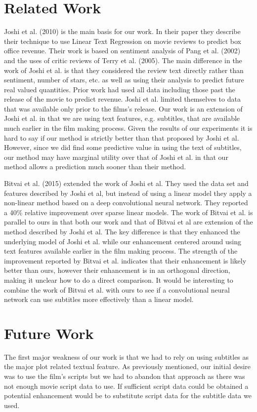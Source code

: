 \documentclass[11pt]{article}
\begin{document}
\section{Related Work}
Joshi et al. (2010) is the main basis for our work. In their paper they describe their
technique to use Linear Text Regression on movie reviews to predict box office revenue.
Their work is based on sentiment analysis of Pang et al. (2002) and the uses of critic
reviews of Terry et al. (2005). The main difference in the work of Joshi et al. is that
they considered the review text directly rather than sentiment, number of stars, etc. as
well as using their analysis to predict future real valued quantities. Prior work had
used all data including those past the release of the movie to predict revenue. Joshi
et al. limited themselves to data that was available only prior to the films's release.
Our work is an extension of Joshi et al. in that we are using text features, e.g.
subtitles, that are available much earlier in the film making process. Given the results
of our experiments it is hard to say if our method is strictly better than that proposed
by Joshi et al. However, since we did find some predictive value in using the text of
subtitles, our method may have marginal utility over that of Joshi et al. in that our
method allows a prediction much sooner than their method.

Bitvai et al. (2015) extended the work of Joshi et al. They used the data set and
features described by Joshi et al, but instead of using a linear model they apply
a non-linear method based on a deep convolutional neural network. They reported a 40\%
relative improvement over sparse linear models. The work of Bitvai et al. is parallel to
ours in that both our work and that of Bitvai et al are extension of the method described
by Joshi et al. The key difference is that they enhanced the underlying model of Joshi
et al. while our enhancement centered around using text features available earlier
in the film making process. The strength of the improvement reported by Bitvai et al. 
indicates that their enhancement is likely better than ours, however their enhancement is
in an orthogonal direction, making it unclear how to do a direct comparison.
It would be interesting to combine the work of Bitvai et al. with ours to see if a
convolutional neural network can use subtitles more effectively than a linear model.

\section{Future Work}
The first major weakness of our work is that we had to rely on using subtitles as the
major plot related textual feature. As previously mentioned, our initial desire was to
use the film's scripts but we had to abandon that approach as there was not enough
movie script data to use. If sufficient script data could be obtained a potential
enhancement would be to substitute script data for the subtitle data we used.
\end{document}

